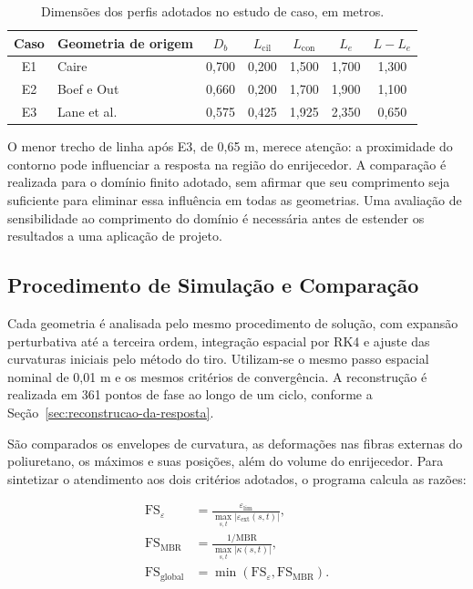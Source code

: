 \documentclass[arial,centeredequations,english,brazilian,oneside,section=TITLE]{ifes8}
\begin{document}
\begin{table}[!htbp]
  \centering
  \caption{Dimensões dos perfis adotados no estudo de caso, em metros.}
  \label{tab:geometrias-adotadas-estudo}
  \begin{tabular}{c l c c c c c}
    \hline
    Caso & Geometria de origem & $D_b$ & $L_{\mathrm{cil}}$
      & $L_{\mathrm{con}}$ & $L_e$ & $L-L_e$\\
    \hline
    E1 & Caire & 0,700 & 0,200 & 1,500 & 1,700 & 1,300\\
    E2 & Boef e Out & 0,660 & 0,200 & 1,700 & 1,900 & 1,100\\
    E3 & Lane et al. & 0,575 & 0,425 & 1,925 & 2,350 & 0,650\\
    \hline
  \end{tabular}
\end{table}

O menor trecho de linha após E3, de 0,65 m, merece atenção: a proximidade
do contorno pode influenciar a resposta na região do enrijecedor. A
comparação é realizada para o domínio finito adotado, sem afirmar que
seu comprimento seja suficiente para eliminar essa influência em todas
as geometrias. Uma avaliação de sensibilidade ao comprimento do domínio
é necessária antes de estender os resultados a uma aplicação de projeto.

\subsection{Procedimento de Simulação e Comparação}
\label{sec:procedimento-estudo-de-caso}

Cada geometria é analisada pelo mesmo procedimento de solução, com expansão
perturbativa até a terceira ordem, integração espacial por RK4 e ajuste
das curvaturas iniciais pelo método do tiro. Utilizam-se o mesmo passo
espacial nominal de 0,01 m e os mesmos critérios de convergência.
A reconstrução é realizada em 361 pontos de fase ao longo de um ciclo,
conforme a Seção~\ref{sec:reconstrucao-da-resposta}.

São comparados os envelopes de curvatura, as deformações nas fibras externas
do poliuretano, os máximos e suas posições, além do volume do enrijecedor.
Para sintetizar o atendimento aos dois critérios adotados, o programa
calcula as razões:

\begin{align}
  \mathrm{FS}_{\varepsilon}
    &=\frac{\varepsilon_{\mathrm{lim}}}
      {\max_{s,t}|\varepsilon_{\mathrm{ext}}(s,t)|},
    \label{eq:fs-deformacao-estudo}\\
  \mathrm{FS}_{\mathrm{MBR}}
    &=\frac{1/\mathrm{MBR}}{\max_{s,t}|\kappa(s,t)|},
    \label{eq:fs-mbr-estudo}\\
  \mathrm{FS}_{\mathrm{global}}
    &=\min(\mathrm{FS}_{\varepsilon},\mathrm{FS}_{\mathrm{MBR}}).
    \label{eq:fs-global-estudo}
\end{align}
\end{document}
